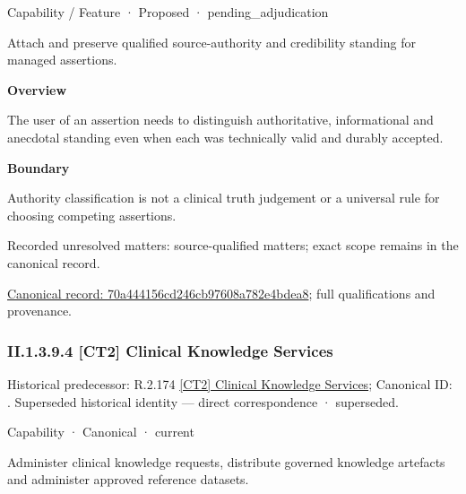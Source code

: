 \label{element:70a444156cd246cb97608a782e4bdea8}
{\small Capability / Feature · Proposed · pending\_adjudication}\par

Attach and preserve qualified source-authority and credibility standing for managed assertions.



\textbf{Overview}



The user of an assertion needs to distinguish authoritative, informational and anecdotal standing even when each was technically valid and durably accepted.



\textbf{Boundary}



Authority classification is not a clinical truth judgement or a universal rule for choosing competing assertions.


{\small Recorded unresolved matters: source-qualified matters; exact scope remains in the canonical record.}\par
{\footnotesize \href{../../../../../../../continuum/strategy/capability/feature/70a444156cd246cb97608a782e4bdea8.md}{Canonical record: 70a444156cd246cb97608a782e4bdea8}; full qualifications and provenance.}\par
\subsubsection*{II.1.3.9.4 [CT2] Clinical Knowledge Services}
\label{navigation:II.1.3.9.4}

{\small Historical predecessor: R.2.174 \hyperref[element:5b8478b08c3f42c0a3480edb8f0b9ea7]{[CT2] Clinical Knowledge Services}; Canonical ID: \texttt{}. Superseded historical identity — direct correspondence · superseded.}\par
\label{element:bbd2bd21859f40e39963bdbe7a851686}
{\small Capability · Canonical · current}\par

Administer clinical knowledge requests, distribute governed knowledge artefacts and administer approved reference datasets.



